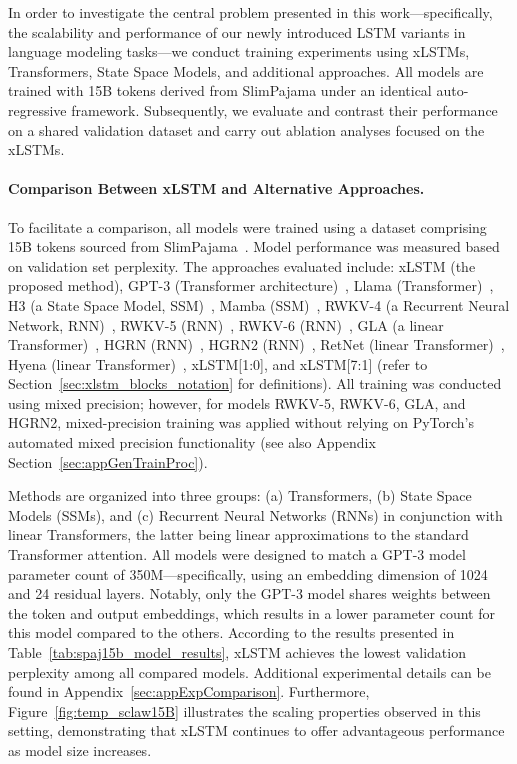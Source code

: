 In order to investigate the central problem presented in this work—specifically, the scalability and performance of our newly introduced LSTM variants in language modeling tasks—we conduct training experiments using xLSTMs, Transformers, State Space Models, and additional approaches. All models are trained with 15B tokens derived from SlimPajama under an identical auto-regressive framework. Subsequently, we evaluate and contrast their performance on a shared validation dataset and carry out ablation analyses focused on the xLSTMs.

\paragraph{Comparison Between xLSTM and Alternative Approaches.} To facilitate a comparison, all models were trained using a dataset comprising 15B tokens sourced from SlimPajama~\citep{Soboleva:23}. Model performance was measured based on validation set perplexity. The approaches evaluated include: xLSTM (the proposed method), GPT-3 (Transformer architecture)~\citep{Brown:20short}, Llama (Transformer)~\citep{Touvron:23arxiv}, H3 (a State Space Model, SSM)~\citep{Fu:23}, Mamba (SSM)~\citep{Gu:24arxiv}, RWKV-4 (a Recurrent Neural Network, RNN)~\citep{Peng:23arxivshort}, RWKV-5 (RNN)~\citep{Peng:24arxivshort}, RWKV-6 (RNN)~\citep{Peng:24arxivshort}, GLA (a linear Transformer)~\citep{Yang:23arxiv}, HGRN (RNN)~\citep{Qin:23}, HGRN2 (RNN)~\citep{Qin:24arxiv}, RetNet (linear Transformer)~\citep{Sun:23arxiv}, Hyena (linear Transformer)~\citep{Poli:23}, xLSTM[1:0], and xLSTM[7:1] (refer to Section~\ref{sec:xlstm_blocks_notation} for definitions). All training was conducted using mixed precision; however, for models RWKV-5, RWKV-6, GLA, and HGRN2, mixed-precision training was applied without relying on PyTorch’s automated mixed precision functionality (see also Appendix Section~\ref{sec:appGenTrainProc}).

Methods are organized into three groups: (a) Transformers, (b) State Space Models (SSMs), and (c) Recurrent Neural Networks (RNNs) in conjunction with linear Transformers, the latter being linear approximations to the standard Transformer attention. All models were designed to match a GPT-3 model parameter count of 350M—specifically, using an embedding dimension of 1024 and 24 residual layers. Notably, only the GPT-3 model shares weights between the token and output embeddings, which results in a lower parameter count for this model compared to the others. According to the results presented in Table~\ref{tab:spaj15b_model_results}, xLSTM achieves the lowest validation perplexity among all compared models. Additional experimental details can be found in Appendix~\ref{sec:appExpComparison}. Furthermore, Figure~\ref{fig:temp_sclaw15B} illustrates the scaling properties observed in this setting, demonstrating that xLSTM continues to offer advantageous performance as model size increases.

